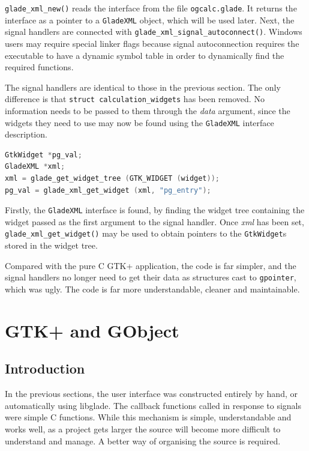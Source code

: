 \documentclass[a4paper,oneside]{article}
\newcommand{\filename}[1]{\texttt{#1}}
\newcommand{\variable}[1]{\textsl{#1}}
\newcommand{\class}[1]{\texttt{#1}}
\newcommand{\function}[1]{\texttt{#1()}}
\newcommand{\type}[1]{\texttt{#1}}
\begin{document}
\function{glade\_xml\_new} reads the interface from the file
\filename{ogcalc.glade}.  It returns the interface as a pointer to a
\class{GladeXML} object, which will be used later.  Next, the signal
handlers are connected with
\function{glade\_xml\_signal\_autoconnect}.  Windows users may require
special linker flags because signal autoconnection requires the
executable to have a dynamic symbol table in order to dynamically find
the required functions.

The signal handlers are identical to those in the previous section.
The only difference is that \type{struct calculation\_widgets} has been
removed.  No information needs to be passed to them through the
\variable{data} argument, since the widgets they need to use may now
be found using the \class{GladeXML} interface description.

\begin{lstlisting}[numbers=none, language=C]
GtkWidget *pg_val;
GladeXML *xml;
xml = glade_get_widget_tree (GTK_WIDGET (widget));
pg_val = glade_xml_get_widget (xml, "pg_entry");
\end{lstlisting}

Firstly, the \class{GladeXML} interface is found, by finding the
widget tree containing the widget passed as the first argument to the
signal handler.  Once \variable{xml} has been set,
\function{glade\_xml\_get\_widget} may be used to obtain pointers to
the \class{GtkWidget}s stored in the widget tree.

Compared with the pure C GTK+ application, the code is far simpler,
and the signal handlers no longer need to get their data as structures
cast to \type{gpointer}, which was ugly.  The code is far more
understandable, cleaner and maintainable.


\section{GTK+ and GObject}

\label{sec:gobject}

\subsection{Introduction}

In the previous sections, the user interface was constructed entirely
by hand, or automatically using libglade.  The callback functions
called in response to signals were simple C functions.  While this
mechanism is simple, understandable and works well, as a project gets
larger the source will become more difficult to understand and manage.
A better way of organising the source is required.
\end{document}
